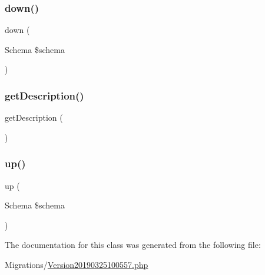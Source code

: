\subsubsection{\texorpdfstring{down()}{down()}}
{\footnotesize\ttfamily down (\begin{DoxyParamCaption}\item[{Schema}]{\$schema }\end{DoxyParamCaption})}

\mbox{\label{class_doctrine_migrations_1_1_version20190325100557_a2e7bb35c71bf1824456ceb944cb7a845}} 
\subsubsection{\texorpdfstring{getDescription()}{getDescription()}}
{\footnotesize\ttfamily get\+Description (\begin{DoxyParamCaption}{ }\end{DoxyParamCaption})}

\mbox{\label{class_doctrine_migrations_1_1_version20190325100557_a23eb1c1428e8ea2ab2cf798fc06ec421}} 
\subsubsection{\texorpdfstring{up()}{up()}}
{\footnotesize\ttfamily up (\begin{DoxyParamCaption}\item[{Schema}]{\$schema }\end{DoxyParamCaption})}



The documentation for this class was generated from the following file\+:\begin{DoxyCompactItemize}
\item 
Migrations/\mbox{\hyperlink{_version20190325100557_8php}{Version20190325100557.\+php}}\end{DoxyCompactItemize}
